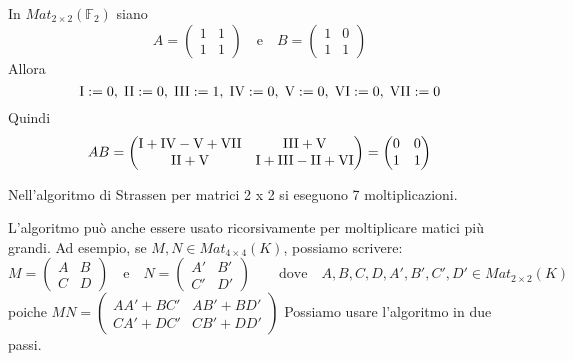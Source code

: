 \documentclass[../main.tex]{subfiles}
\begin{document}
\begin{example}
    In $Mat_{2 \times 2}(\mathbb{F}_2)$ siano
    \begin{equation*}
        A = \begin{pmatrix} 1 & 1 \\ 1 & 1 \end{pmatrix} \quad \text{e} \quad B = \begin{pmatrix} 1 & 0 \\ 1 & 1 \end{pmatrix}
    \end{equation*}
    Allora
    \begin{equation*}
        \RomanNumber 1 := 0, \;
        \RomanNumber 2 := 0, \;
        \RomanNumber 3 := 1, \;
        \RomanNumber 4 := 0, \;
        \RomanNumber 5  := 0, \;
        \RomanNumber 6  := 0, \;
        \RomanNumber 7  := 0
    \end{equation*}
    Quindi
    \begin{equation*}
        AB = \begin{pmatrix} \RomanNumber 1 + \RomanNumber 4 - \RomanNumber 5 + \RomanNumber 7 & \RomanNumber 3 + \RomanNumber 5 \\ \RomanNumber 2 + \RomanNumber 5 & \RomanNumber 1 + \RomanNumber 3 - \RomanNumber 2 + \RomanNumber 6 \end{pmatrix} =
        \begin{pmatrix} 0 & 0 \\ 1 & 1 \end{pmatrix}
    \end{equation*}
\end{example}

Nell'algoritmo di Strassen per matrici 2 x 2 si eseguono 7 moltiplicazioni.

L'algoritmo può anche essere usato ricorsivamente per moltiplicare matici più grandi. Ad esempio, se $M, N \in Mat_{4 \times 4}(K)$, possiamo scrivere:
\begin{equation*}
    M = \begin{pmatrix} A & B \\ C & D \end{pmatrix} \quad \text{e} \quad N = \begin{pmatrix} A' & B' \\ C' & D' \end{pmatrix} \qquad
    \text{dove} \quad A, B, C, D, A', B', C', D' \in Mat_{2 \times 2}(K)
\end{equation*}
poiche $MN = \begin{pmatrix} AA' + BC' & AB' + BD' \\ CA' + DC' & CB' + DD' \end{pmatrix}$
Possiamo usare l'algoritmo in due passi.
\end{document}

